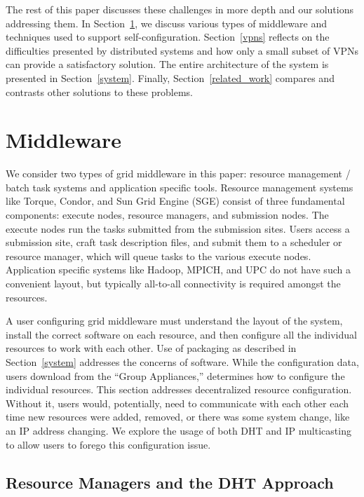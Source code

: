 \documentclass[conference]{IEEEtran}
\begin{document}
The rest of this paper discusses these challenges in more depth and our
solutions addressing them.  In Section~\ref{middleware}, we discuss various
types of middleware and techniques used to support self-configuration.
Section~\ref{vpns} reflects on the difficulties presented by distributed
systems and how only a small subset of VPNs can provide a satisfactory
solution.  The entire architecture of the system is presented in
Section~\ref{system}.  Finally, Section~\ref{related_work} compares and
contrasts other solutions to these problems.

\section{Middleware}
\label{middleware}

We consider two types of grid middleware in this paper:  resource management /
batch task systems and application specific tools.  Resource management systems
like Torque, Condor, and Sun Grid Engine (SGE) consist of three fundamental
components: execute nodes, resource managers, and submission nodes.  The
execute nodes run the tasks submitted from the submission sites.  Users access
a submission site, craft task description files, and submit them to a scheduler
or resource manager, which will queue tasks to the various execute nodes.
Application specific systems like Hadoop, MPICH, and UPC do not have such a
convenient layout, but typically all-to-all connectivity is required amongst
the resources.

A user configuring grid middleware must understand the layout of the system,
install the correct software on each resource, and then configure all the
individual resources to work with each other.  Use of packaging as described in
Section~\ref{system} addresses the concerns of software.  While the
configuration data, users download from the ``Group Appliances,'' determines
how to configure the individual resources.  This section addresses
decentralized resource configuration.  Without it, users would, potentially,
need to communicate with each other each time new resources were added,
removed, or there was some system change, like an IP address changing.  We
explore the usage of both DHT and IP multicasting to allow users to forego this
configuration issue.

\subsection{Resource Managers and the DHT Approach}
\end{document}
